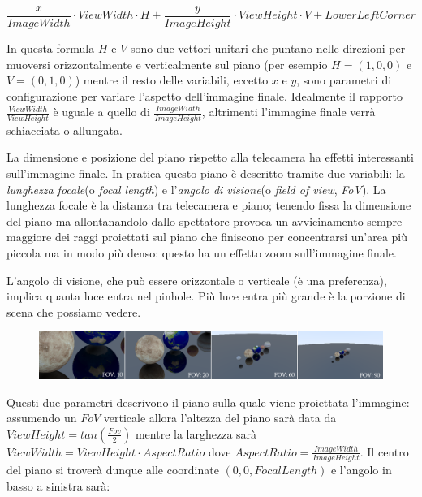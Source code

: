 \documentclass[12pt, twoside]{article}
\begin{document}
$$
  \frac{x}{ImageWidth} \cdot ViewWidth \cdot H + \frac{y}{ImageHeight} \cdot ViewHeight \cdot V + LowerLeftCorner
$$

In questa formula $H$ e $V$ sono due vettori unitari che puntano nelle
direzioni per muoversi orizzontalmente e verticalmente sul piano
(per esempio $H=(1, 0, 0)$ e $V=(0, 1, 0)$) mentre il resto delle variabili,
eccetto $x$ e $y$, sono parametri di configurazione per variare l'aspetto
dell'immagine finale.
Idealmente il rapporto $\frac{ViewWidth}{ViewHeight}$ è uguale a quello di
$\frac{ImageWidth}{ImageHeight}$, altrimenti l'immagine finale verrà
schiacciata o allungata.

La dimensione e posizione del piano rispetto alla telecamera ha effetti
interessanti sull'immagine finale.
In pratica questo piano è descritto tramite due variabili: la
\textit{lunghezza focale}(o \textit{focal length}) e
l'\textit{angolo di visione}(o \textit{field of view}, \textit{FoV}).
La lunghezza focale è la distanza tra telecamera e piano; tenendo fissa la
dimensione del piano ma allontanandolo dallo spettatore provoca un
avvicinamento sempre maggiore dei raggi proiettati sul piano che finiscono
per concentrarsi un'area più piccola ma in modo più denso:
questo ha un effetto zoom sull'immagine finale.

\begin{figure}[h]
\end{figure}

L'angolo di visione, che può essere orizzontale o verticale (è una preferenza),
implica quanta luce entra nel pinhole.
Più luce entra più grande è la porzione di scena che possiamo vedere. 

\begin{figure}[h]
  \centering
  \includegraphics[width=\linewidth,keepaspectratio]{images/fov_changes.png}
\end{figure}

Questi due parametri descrivono il piano sulla quale viene proiettata
l'immagine:
assumendo un $FoV$ verticale allora l'altezza del piano sarà data da
$ViewHeight = tan(\frac{Fov}{2})$ mentre la larghezza sarà
$ViewWidth = ViewHeight \cdot AspectRatio$ dove
$AspectRatio = \frac{ImageWidth}{ImageHeight}$.
Il centro del piano si troverà dunque alle coordinate
$(0, 0, FocalLength)$ e l'angolo in basso a sinistra sarà:
\end{document}
